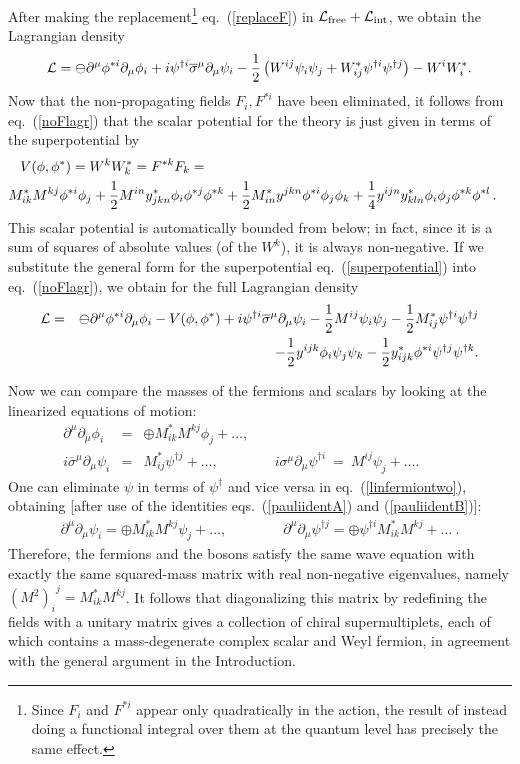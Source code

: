 \documentclass[12pt]{article}
\def\BDpos{}
\def\BDneg{-}
\def\BDpos{-}
\def\BDneg{}
\def\BDpos{\oplus}
\def\BDneg{\ominus}
\def\BDpos{\ominus}
\def\BDneg{\oplus}
\def\beq{\begin{eqnarray}}
\def\eeq{\end{eqnarray}}
\def\lagr{{\cal L}}
\def\sigmabar{\overline\sigma}
\def\half{{1\over 2}}
\begin{document}
After making the replacement\footnote{Since $F_i$ and $F^{*i}$ appear only
quadratically in the action, the result of instead doing a functional
integral over them at the quantum level has precisely the same effect.}
eq.~(\ref{replaceF}) in $\lagr_{\rm free} + \lagr_{\rm int}$, we obtain
the Lagrangian density
\beq
\lagr = \BDpos\partial^\mu \phi^{*i} \partial_\mu \phi_i
+ i \psi^{\dagger i} \sigmabar^\mu \partial_\mu \psi_i
-\half \left (W^{ij} \psi_i \psi_j  + W^{*}_{ij} \psi^{\dagger i}
\psi^{\dagger j} \right )
- W^i W^{*}_i.
\label{noFlagr}
\eeq
Now that the non-propagating fields $F_i, F^{*i}$ have been eliminated, it
follows from eq.~(\ref{noFlagr}) that the scalar potential for the theory
is just given in terms of the superpotential by
\beq
V(\phi,\phi^*) = W^k W_k^* = F^{*k} F_k = 
\phantom{xxxxxxxxxxxxxxxxxxxxxxxxxxxxxxxxxxxx.}
&&
\nonumber
\\ 
M^*_{ik} M^{kj} \phi^{*i} \phi_{j}
+{1\over 2} M^{in} y_{jkn}^* \phi_i \phi^{*j} \phi^{*k}
+{1\over 2} M_{in}^{*} y^{jkn} \phi^{*i} \phi_j \phi_k
+{1\over 4} y^{ijn} y_{kln}^{*} \phi_i \phi_j \phi^{*k} \phi^{*l}
\, .
&&
\label{ordpot}
\eeq
This scalar potential is automatically bounded from below; in fact, since
it is a sum of squares of absolute values (of the $W^k$), it is always
non-negative. If we substitute the general form for the superpotential
eq.~(\ref{superpotential}) into eq.~(\ref{noFlagr}), we obtain for the
full Lagrangian density
\beq
\lagr &=&
\BDpos \partial^\mu \phi^{*i} \partial_\mu \phi_i - V(\phi,\phi^*)
+ i \psi^{\dagger i} \sigmabar^\mu \partial_\mu \psi_i
- \half M^{ij} \psi_i\psi_j - \half M_{ij}^{*} \psi^{\dagger i}
\psi^{\dagger j}
\nonumber\\
&& - \half y^{ijk} \phi_i \psi_j \psi_k - \half y_{ijk}^{*} \phi^{*i}
\psi^{\dagger j} \psi^{\dagger k}.
\label{lagrchiral}
\eeq

Now we can compare the masses of the fermions and scalars by looking at
the linearized equations of motion:
\beq
\partial^\mu\partial_\mu \phi_i &=& 
\BDneg 
M_{ik}^{*} M^{kj} \phi_j
+ \ldots,\\
i\sigmabar^\mu\partial_\mu\psi_i &=&  
M_{ij}^{*} \psi^{\dagger j}+\ldots,
\qquad\qquad
i\sigma^\mu\partial_\mu\psi^{\dagger i} \>=\> 
M^{ij} \psi_j +\ldots .\qquad\>\>\>{}
\label{linfermiontwo}
\eeq
One can eliminate $\psi$ in terms of $\psi^\dagger$ and vice versa in
eq.~(\ref{linfermiontwo}), obtaining [after use of the identities
eqs.~(\ref{pauliidentA}) and (\ref{pauliidentB})]:
\beq
\partial^\mu\partial_\mu \psi_i =   
\BDneg M_{ik}^{*} M^{kj} \psi_j
+ \ldots ,\qquad\qquad
\partial^\mu\partial_\mu \psi^{\dagger j} =
\BDneg \psi^{\dagger i} M_{ik}^{*} M^{kj}+\ldots
\> .
\eeq
Therefore, the fermions and the bosons satisfy the same wave equation with
exactly the same squared-mass matrix with real non-negative eigenvalues,
namely ${(M^2)_i}^j = M_{ik}^{*} M^{kj}$. It follows that diagonalizing
this matrix by redefining the fields with a unitary matrix gives a
collection of chiral supermultiplets, each of which contains a
mass-degenerate complex scalar and Weyl fermion, in agreement with the
general argument in the Introduction. 
\end{document}
